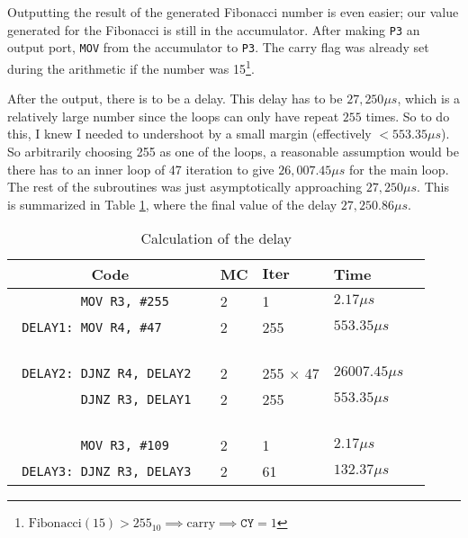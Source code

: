 \documentclass[12pt]{article}
\newcommand{\shellcmd}[1]{\texttt{\colorbox{gray!30}{#1}}}
\begin{document}
Outputting the result of the generated Fibonacci number is even easier; our value generated for the Fibonacci is still in the accumulator. After making \texttt{P3} an output port, \shellcmd{MOV} from the accumulator to \texttt{P3}. The carry flag was already set during the arithmetic if the number was 15\footnote{$\text{Fibonacci}(15) > 255_{10} \implies \text{carry} \implies \texttt{CY} = 1$}.

After the output, there is to be a delay. This delay has to be $27,250 \mu s$, which is a relatively large number since the loops can only have repeat $255$ times. So to do this, I knew I needed to undershoot by a small margin (effectively $< 553.35 \mu s$). So arbitrarily choosing 255 as one of the loops, a reasonable assumption would be there has to an inner loop of 47 iteration to give $26,007.45 \mu s$ for the main loop. The rest of the subroutines was just asymptotically approaching $27,250 \mu s$. This is summarized in Table \ref{table:calculation}, where the final value of the delay $27,250.86 \mu s$.


\begin{table}[!ht]
    \centering
    \begin{tabular}{|c|l|l|l|l|}
        \hline
        \textbf{Code} & \textbf{MC} & $\textbf{Iter}$ & \textbf{Time} \\ \hline
        \verb|         MOV R3, #255     | & 2 & 1               & $ 2.17 \mu s$     \\
        \verb| DELAY1: MOV R4, #47      | & 2 & 255             & $ 553.35 \mu s$   \\
        \verb|                          | &   &                 &                   \\
        \verb| DELAY2: DJNZ R4, DELAY2  | & 2 & 255 $\times$ 47 & $ 26007.45 \mu s$ \\
        \verb|         DJNZ R3, DELAY1  | & 2 & 255             & $ 553.35 \mu s$   \\
        \verb|                          | &   &                 &                   \\
        \verb|         MOV R3, #109     | & 2 & 1               & $ 2.17 \mu s$     \\
        \verb| DELAY3: DJNZ R3, DELAY3  | & 2 & 61              & $ 132.37 \mu s$   \\ \hline
    \end{tabular}

    \caption{Calculation of the delay}
    \label{table:calculation}
\end{table}
\end{document}
